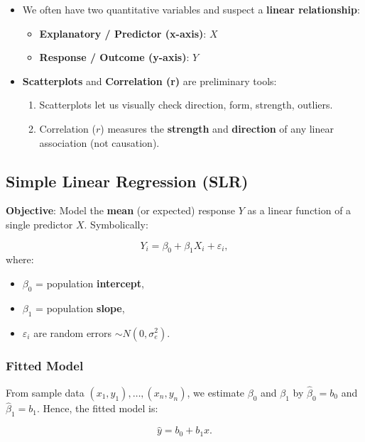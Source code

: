 \documentclass[10pt]{extarticle}
\begin{document}
\begin{itemize}
    \item We often have two quantitative variables and suspect a \textbf{linear relationship}:
          \begin{itemize}
              \item \textbf{Explanatory / Predictor (x-axis)}: $X$
              \item \textbf{Response / Outcome (y-axis)}: $Y$
          \end{itemize}
    \item \textbf{Scatterplots} and \textbf{Correlation (r)} are preliminary tools:
          \begin{enumerate}
              \item Scatterplots let us visually check direction, form, strength, outliers.
              \item Correlation ($r$) measures the \textbf{strength} and \textbf{direction} of any linear association (not causation).
          \end{enumerate}
\end{itemize}



\subsection{Simple Linear Regression (SLR)}

\textbf{Objective}: Model the \textbf{mean} (or expected) response $Y$ as a linear function of a single predictor $X$. Symbolically:

\[
    Y_i = \beta_0 + \beta_1 X_i + \varepsilon_i,
\]
where:
\begin{itemize}
    \item $\beta_0$ = population \textbf{intercept},
    \item $\beta_1$ = population \textbf{slope},
    \item $\varepsilon_i$ are random errors $\sim N(0,\sigma_e^2)$.
\end{itemize}

\subsubsection{Fitted Model}

From sample data $(x_1,y_1),\dots,(x_n,y_n)$, we estimate $\beta_0$ and $\beta_1$ by $\hat{\beta}_0 = b_0$ and $\hat{\beta}_1 = b_1$. Hence, the fitted model is:

\[
    \hat{y} = b_0 + b_1 x.
\]
\end{document}
